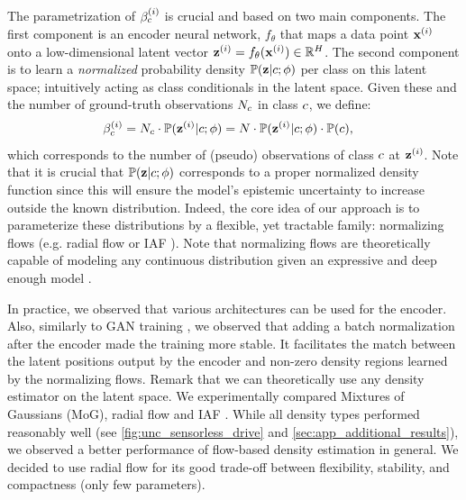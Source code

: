 The parametrization of $\beta_c^{(i)}$ is crucial and based on two main components. The first component is an encoder neural network, $f_{\theta}$ that maps a data point $\mathbf{x}^{(i)}$ onto a low-dimensional latent vector $\bold{z}^{(i)}=f_{\theta}(\mathbf{x}^{(i)}) \in \mathbb{R}^{H}$. The second component is to learn a \textit{normalized} probability density $\mathbb{P}(\bold{z} | c; \phi)$ per class on this latent space; intuitively acting as class conditionals in the latent space. Given these and the number of ground-truth observations $N_c$ in class  $c$, we define:
\begin{equation}
\begin{aligned}
\label{eq:additional_observations}
	\beta_c^{(i)} &= N_c \cdot \mathbb{P}(\bold{z}^{(i)} | c; \phi) = N \cdot \mathbb{P}(\bold{z}^{(i)} | c; \phi) \cdot \mathbb{P}(c),
\end{aligned}
\end{equation}
which corresponds to the number of (pseudo) observations of class $c$ at $\bold{z} ^{(i)}$. Note that it is crucial that $\mathbb{P}(\bold{z} | c; \phi)$ corresponds to a proper normalized density function since this will ensure the model's epistemic uncertainty to increase outside the known distribution. Indeed, the core idea of our approach is to parameterize these distributions by a flexible, yet tractable family: normalizing flows (e.g. radial flow \cite{radialflow} or IAF \cite{iaf_flow}). Note that normalizing flows are theoretically capable of modeling any continuous distribution given an expressive and deep enough model \cite{neural_flow, iaf_flow}.

In practice, we observed that various architectures can be used for the encoder. Also, similarly to GAN training \cite{GAN_batch_norm}, we observed that adding a batch normalization after the encoder made the training more stable. It facilitates the match between the latent positions output by the encoder and non-zero density regions learned by the normalizing flows. Remark that we can theoretically use any density estimator on the latent space. We experimentally compared Mixtures of Gaussians (MoG), radial flow \cite{radialflow} and IAF \cite{iaf_flow}. While all density types performed reasonably well (see \cref{fig:unc_sensorless_drive} and \cref{sec:app_additional_results}), we observed a better performance of flow-based density estimation in general. We decided to use radial flow for its good trade-off between flexibility, stability, and compactness (only few parameters).

